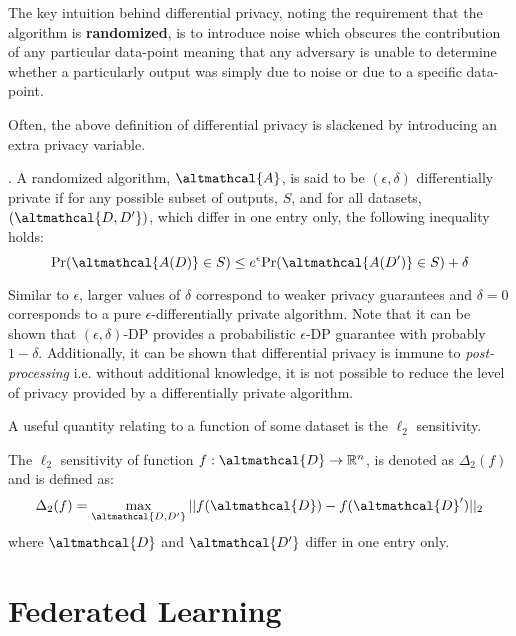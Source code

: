 The key intuition behind differential privacy, noting the requirement that the algorithm is \textbf{randomized}, is to introduce noise which obscures the contribution of any particular data-point meaning that any adversary is unable to determine whether a particularly output was simply due to noise or due to a specific data-point. 

Often, the above definition of differential privacy is slackened by introducing an extra privacy variable. 

\begin{definition}. A randomized algorithm, $\altmathcal{A}$, is said to be $(\epsilon, \delta)$ differentially private if for any possible subset of outputs, $S$, and for all datasets, $(\altmathcal{D, D'})$, which differ in one entry only, the following inequality holds:
	\begin{equation}
	\text{Pr}(\altmathcal{A(D)} \in S) \leq e^\epsilon \text{Pr}(\altmathcal{A(D')} \in S) + \delta
	\end{equation}
\end{definition}
Similar to $\epsilon$, larger values of $\delta$ correspond to weaker privacy guarantees and $\delta=0$ corresponds to a pure $\epsilon$-differentially private algorithm. Note that it can be shown that $(\epsilon, \delta)$-DP provides a probabilistic $\epsilon$-DP guarantee with probably $1-\delta$. Additionally, it can be shown that differential privacy is immune to \emph{post-processing} i.e. without additional knowledge, it is not possible to reduce the level of privacy provided by a differentially private algorithm. \cite{foundations}

A useful quantity relating to a function of some dataset is the $\ell_2$ sensitivity. 
\begin{definition}
	The $\ell_2$ sensitivity of function $f: \altmathcal{D} \rightarrow \mathbb{R}^n$, is denoted as $\Delta_2(f)$ and is defined as:
	\begin{align}
		\Delta_2(f) = \max_{\altmathcal{D, D'}} || f(\altmathcal{D}) - f(\altmathcal{D}')||_2
	\end{align}
	where $\altmathcal{D}$ and $\altmathcal{D'}$ differ in one entry only. 
\end{definition}

\section{Federated Learning}